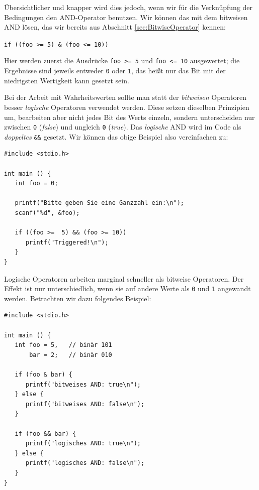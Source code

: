 Übersichtlicher und knapper wird dies jedoch, wenn wir für die Verknüpfung der Bedingungen den AND-Operator benutzen. Wir können das mit dem bitweisen AND lösen, das wir bereits aus Abschnitt \ref{sec:BitwiseOperator} kennen:
\begin{center}
\texttt{if ((foo >=  5) & (foo <= 10))}
\end{center}

Hier werden zuerst die Ausdrücke \texttt{foo >= 5} und \texttt{foo <= 10} ausgewertet; die Ergebnisse sind jeweils entweder \texttt{0} oder \texttt{1}, das heißt nur das Bit mit der niedrigsten Wertigkeit kann gesetzt sein.

Bei der Arbeit mit Wahrheitswerten sollte man statt der \emph{bitweisen} Operatoren besser \emph{logische} Operatoren verwendet werden. Diese setzen dieselben Prinzipien um, bearbeiten aber nicht jedes Bit des Werts einzeln, sondern unterscheiden nur zwischen \texttt{0} (\emph{false}) und ungleich \texttt{0} (\emph{true}). Das \emph{logische} AND wird im Code als \emph{doppeltes} \texttt{\&\&} gesetzt. Wir können das obige Beispiel also vereinfachen zu:

\begin{codebox}
\begin{verbatim}
#include <stdio.h>

int main () {
   int foo = 0;
   
   printf("Bitte geben Sie eine Ganzzahl ein:\n");
   scanf("%d", &foo);

   if ((foo >=  5) && (foo >= 10))
      printf("Triggered!\n");
   }
}
\end{verbatim}
\end{codebox}

Logische Operatoren arbeiten marginal schneller als bitweise Operatoren. Der Effekt ist nur unterschiedlich, wenn sie auf andere Werte als \texttt{0} und \texttt{1} angewandt werden. Betrachten wir dazu folgendes Beispiel:

\begin{codebox}
\begin{verbatim}
#include <stdio.h>

int main () {
   int foo = 5,   // binär 101
       bar = 2;   // binär 010
   
   if (foo & bar) {
      printf("bitweises AND: true\n");
   } else {
      printf("bitweises AND: false\n");
   }
   
   if (foo && bar) {
      printf("logisches AND: true\n");
   } else {
      printf("logisches AND: false\n");
   }
}
\end{verbatim}
\end{codebox}

